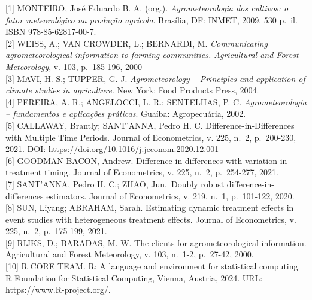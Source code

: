 \documentclass[
  brazilian,
  12pt,
  a4paper,
]{article}
\begin{document}
{[}1{]} MONTEIRO, José Eduardo B. A. (org.). \emph{Agrometeorologia dos
cultivos: o fator meteorológico na produção agrícola}. Brasília, DF:
INMET, 2009. 530 p.~il. ISBN 978-85-62817-00-7.\\
{[}2{]} WEISS, A.; VAN CROWDER, L.; BERNARDI, M. \emph{Communicating
agrometeorological information to farming communities. Agricultural and
Forest Meteorology}, v. 103, p.~185-196, 2000\\
{[}3{]} MAVI, H. S.; TUPPER, G. J. \emph{Agrometeorology -- Principles
and application of climate studies in agriculture}. New York: Food
Products Press, 2004.\\
{[}4{]} PEREIRA, A. R.; ANGELOCCI, L. R.; SENTELHAS, P. C.
\emph{Agrometeorologia -- fundamentos e aplicações práticas}. Guaíba:
Agropecuária, 2002.\\
{[}5{]} CALLAWAY, Brantly; SANT'ANNA, Pedro H. C.
Difference-in-Differences with Multiple Time Periods. Journal of
Econometrics, v. 225, n.~2, p.~200-230, 2021. DOI:
\url{https://doi.org/10.1016/j.jeconom.2020.12.001}\\
{[}6{]} GOODMAN-BACON, Andrew. Difference-in-differences with variation
in treatment timing. Journal of Econometrics, v. 225, n.~2, p.~254-277,
2021.\\
{[}7{]} SANT'ANNA, Pedro H. C.; ZHAO, Jun.~Doubly robust
difference-in-differences estimators. Journal of Econometrics, v. 219,
n.~1, p.~101-122, 2020.\\
{[}8{]} SUN, Liyang; ABRAHAM, Sarah. Estimating dynamic treatment
effects in event studies with heterogeneous treatment effects. Journal
of Econometrics, v. 225, n.~2, p.~175-199, 2021.\\
{[}9{]} RIJKS, D.; BARADAS, M. W. The clients for agrometeorological
information. Agricultural and Forest Meteorology, v. 103, n.~1-2,
p.~27-42, 2000.\\
{[}10{]} R CORE TEAM. R: A language and environment for statistical
computing. R Foundation for Statistical Computing, Vienna, Austria,
2024. URL: https://www.R-project.org/.
\end{document}
